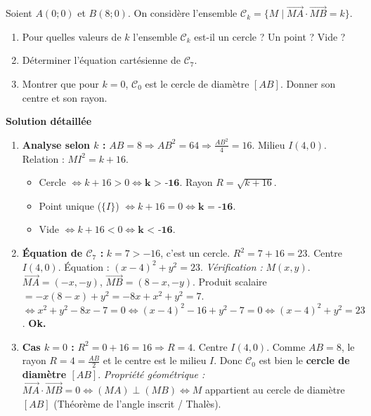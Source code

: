 \documentclass[11pt]{article}
\begin{document}
\begin{exoresolu}[Produit scalaire $\overrightarrow{MA} \cdot \overrightarrow{MB} = k$ — Cercle de diamètre]
Soient $A(0;0)$ et $B(8;0)$. On considère l'ensemble $\mathcal{C}_k = \{ M \mid \overrightarrow{MA} \cdot \overrightarrow{MB} = k \}$.
\begin{enumerate}
    \item Pour quelles valeurs de $k$ l'ensemble $\mathcal{C}_k$ est-il un cercle ? Un point ? Vide ?
    \item Déterminer l'équation cartésienne de $\mathcal{C}_7$.
    \item Montrer que pour $k=0$, $\mathcal{C}_0$ est le cercle de diamètre $[AB]$. Donner son centre et son rayon.
\end{enumerate}
\tcblower
\textbf{Solution détaillée}
\begin{enumerate}
    \item \textbf{Analyse selon $k$ :}
    $AB = 8 \Rightarrow AB^2 = 64 \Rightarrow \frac{AB^2}{4} = 16$. Milieu $I(4,0)$.
    Relation : $MI^2 = k + 16$.
    \begin{itemize}
        \item Cercle $\iff k + 16 > 0 \iff \textbf{k > -16}$. Rayon $R = \sqrt{k+16}$.
        \item Point unique ($\{I\}$) $\iff k + 16 = 0 \iff \textbf{k = -16}$.
        \item Vide $\iff k + 16 < 0 \iff \textbf{k < -16}$.
    \end{itemize}
    
    \item \textbf{Équation de $\mathcal{C}_7$ :}
    $k=7 > -16$, c'est un cercle. $R^2 = 7+16 = 23$. Centre $I(4,0)$.
    Équation : $(x-4)^2 + y^2 = 23$.
    \emph{Vérification :} $M(x,y)$. $\overrightarrow{MA}=(-x,-y)$, $\overrightarrow{MB}=(8-x,-y)$.
    Produit scalaire $= -x(8-x) + y^2 = -8x + x^2 + y^2 = 7$.
    $\iff x^2+y^2-8x-7=0 \iff (x-4)^2 - 16 + y^2 - 7 = 0 \iff (x-4)^2+y^2=23$. \textbf{Ok.}
    
    \item \textbf{Cas $k=0$ :}
    $R^2 = 0 + 16 = 16 \Rightarrow R = 4$.
    Centre $I(4,0)$.
    Comme $AB=8$, le rayon $R=4 = \frac{AB}{2}$ et le centre est le milieu $I$.
    Donc $\mathcal{C}_0$ est bien le \textbf{cercle de diamètre $[AB]$}.
    \emph{Propriété géométrique :} $\overrightarrow{MA} \cdot \overrightarrow{MB} = 0 \iff (MA) \perp (MB) \iff M$ appartient au cercle de diamètre $[AB]$ (Théorème de l'angle inscrit / Thalès).
\end{enumerate}
\end{exoresolu}
\end{document}
